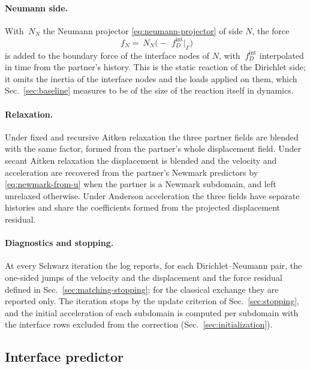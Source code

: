 \documentclass[11pt]{article}
\begin{document}
\paragraph{Neumann side.} With $~N_N$ the Neumann projector
\eqref{eq:neumann-projector} of side $N$, the force
\begin{equation}
  ~f_N = ~N_N \bigl( -\,~f^{\mathrm{int}}_D|_\Gamma \bigr)
  \label{eq:classical-neumann}
\end{equation}
is added to the boundary force of the interface nodes of $N$, with
$~f^{\mathrm{int}}_D$ interpolated in time from the partner's history. This
is the static reaction of the Dirichlet side; it omits the inertia of the
interface nodes and the loads applied on them, which Sec.~\ref{sec:baseline}
measures to be of the size of the reaction itself in dynamics.

\paragraph{Relaxation.} Under fixed and recursive Aitken relaxation the
three partner fields are blended with the same factor, formed from the
partner's whole displacement field. Under secant Aitken relaxation the
displacement is blended and the velocity and acceleration are recovered
from the partner's Newmark predictors by \eqref{eq:newmark-from-u} when
the partner is a Newmark subdomain, and left unrelaxed otherwise. Under
Anderson acceleration the three fields have separate histories and share
the coefficients formed from the projected displacement residual.

\paragraph{Diagnostics and stopping.} At every Schwarz iteration the log
reports, for each Dirichlet--Neumann pair, the one-sided jumps of the
velocity and the displacement and the force residual defined in
Sec.~\ref{sec:matching-stopping}; for the classical exchange they are
reported only. The iteration stops by the update criterion of
Sec.~\ref{sec:stopping}, and the initial acceleration of each subdomain
is computed per subdomain with the interface rows excluded from the
correction (Sec.~\ref{sec:initialization}).

\subsection{Interface predictor}
\label{sec:predictor}
\end{document}
